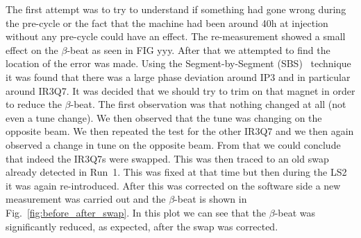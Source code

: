 \documentclass[a4paper]{cernatsnote}
\begin{document}
The first attempt was to try to understand if something had gone wrong during the pre-cycle or the fact that the machine had been around 40h at injection without any pre-cycle could have an effect. The re-measurement showed a small effect on the $\beta$-beat as seen in FIG yyy. After that we attempted to find the location of the error was made. Using the Segment-by-Segment (SBS)~\cite{} technique it was found that there was a large phase deviation around IP3 and in particular around IR3Q7. It was decided that we should try to trim on that magnet in order to reduce the $\beta$-beat. The first observation was that nothing changed at all (not even a tune change). We then observed that the tune was changing on the opposite beam. We then repeated the test for the other IR3Q7 and we then again observed a change in tune on the opposite beam. From that we could conclude that indeed the IR3Q7s were swapped. This was then traced to an old swap already detected in Run~1. This was fixed at that time but then during the LS2 it was again re-introduced. After this was corrected on the software side a new measurement was carried out and the $\beta$-beat is shown in Fig.~\ref{fig:before_after_swap}. In this plot we can see that the $\beta$-beat was significantly reduced, as expected, after the swap was corrected.  
\end{document}
